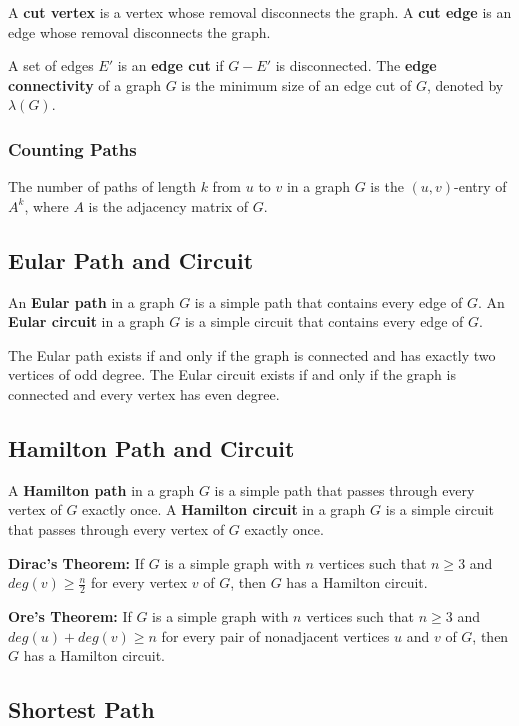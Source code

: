 \documentclass[a4paper,12pt]{article}
\begin{document}
A \textbf{cut vertex} is a vertex whose removal disconnects the graph.
A \textbf{cut edge} is an edge whose removal disconnects the graph.

A set of edges $E'$ is an \textbf{edge cut} if $G - E'$ is disconnected.
The \textbf{edge connectivity} of a graph $G$ is the minimum size of an edge cut of $G$, denoted by $\lambda(G)$.

\subsubsection{Counting Paths}

The number of paths of length $k$ from $u$ to $v$ in a graph $G$ is the $(u,v)$-entry of $A^k$, where $A$ is the adjacency matrix of $G$.

\subsection{Eular Path and Circuit}

An \textbf{Eular path} in a graph $G$ is a simple path that contains every edge of $G$.
An \textbf{Eular circuit} in a graph $G$ is a simple circuit that contains every edge of $G$.

The Eular path exists if and only if the graph is connected and has exactly two vertices of odd degree.
The Eular circuit exists if and only if the graph is connected and every vertex has even degree.

\subsection{Hamilton Path and Circuit}

A \textbf{Hamilton path} in a graph $G$ is a simple path that passes through every vertex of $G$ exactly once.
A \textbf{Hamilton circuit} in a graph $G$ is a simple circuit that passes through every vertex of $G$ exactly once.

\textbf{Dirac's Theorem:}
If $G$ is a simple graph with $n$ vertices such that $n \geq 3$ and $deg(v) \geq \frac{n}{2}$ for every vertex $v$ of $G$, then $G$ has a Hamilton circuit.

\textbf{Ore's Theorem:}
If $G$ is a simple graph with $n$ vertices such that $n \geq 3$ and $deg(u) + deg(v) \geq n$ for every pair of nonadjacent vertices $u$ and $v$ of $G$, then $G$ has a Hamilton circuit.

\subsection{Shortest Path}
\end{document}
